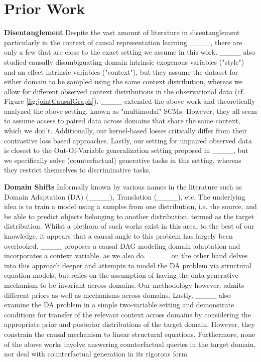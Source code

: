 \section{Prior Work}
\label{subsec:priorwork}
\textbf{Disentanglement} Despite the vast amount of literature in disentanglement particularly in the context of causal representation learning ____, there are only a few that are close to the exact setting we assume in this work. ____ also studied causally disambiguating domain intrinsic exogenous variables ("style") and an effect intrinsic variables ("context"), but they assume the dataset for either domain to be sampled using the same context distribution, whereas we allow for different observed context distributions in the observational data (cf. Figure \ref{fig:jointCausalGraph}). ____ extended the above work and theoretically analyzed the above setting, known as "multimodal" SCMs. However, they all seem to assume access to paired data across domains that share the same context, which we don't. Additionally, our kernel-based losses critically differ from their contrastive loss based approaches. Lastly, our setting for unpaired observed data is closest to the Out-Of-Variable generalization setting proposed in ____, but we specifically solve (counterfactual) generative tasks in this setting, whereas they restrict themselves to discriminative tasks.

\textbf{Domain Shifts} Informally known by various names in the literature such as Domain Adaptation (DA) (____), Translation (____), etc. The underlying idea is to train a model using a samples from one distribution, i.e. the source, and be able to predict objects belonging to another distribution, termed as the target distribution. Whilst a plethora of such works exist in this area, to the best of our knowledge, it appears that a causal angle to this problem has largely been overlooked. ____ proposes a causal DAG modeling domain adaptation and incorporates a context variable, as we also do. ____ on the other hand delves into this approach deeper and attempts to model the DA problem via structural equation models, but relies on the assumption of having the data generative mechanism to be invariant across domains. Our methodology however, admits different priors as well as mechanisms across domains. 
Lastly, ____ also examine the DA problem in a simple two-variable setting and demonstrate conditions for transfer of the relevant context across domains by considering the appropriate prior and posterior distributions of the target domain. However, they constrain the causal mechanism to linear structural equations. Furthermore, none of the above works involve answering counterfactual queries in the target domain, nor deal with counterfactual generation in its rigorous form.